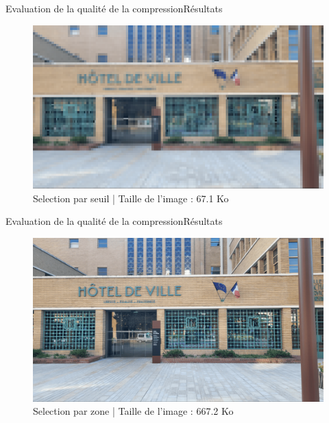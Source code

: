 \begin{frame}{Evaluation de la qualité de la compression}{Résultats}
  \begin{figure}
  \includegraphics[scale=0.32]{images/resultats_compression/mairie_petit_tcd_seuil_finale.png} 
  \caption{Selection par seuil | Taille de l'image : 67.1 Ko}
  \end{figure}
\end{frame}


\begin{frame}{Evaluation de la qualité de la compression}{Résultats}
    \begin{figure}
		\includegraphics[scale=0.32]{images/resultats_compression/mairie_petit_tcd_zone_finale.png}
    \caption{Selection par zone | Taille de l'image : 667.2 Ko}
    \end{figure}
\end{frame}


